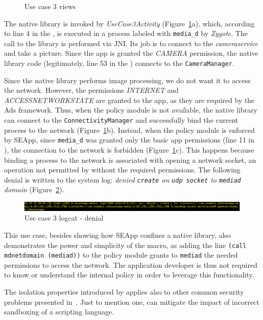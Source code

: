 \begin{figure}[h]
  \caption{\label{fig:seapp_uc3_views} Use case 3 views}
\end{figure}

The native library is invoked by {\em UseCase3Activity}
(Figure~\ref{fig:seapp_uc3_views}a), which, according to line 4 in the
\seappcontexts, is executed in a process labeled with {\tt media\_d}
by {\em Zygote}.  The call to the library is performed via JNI. Its
job is to connect to the {\em camera\textunderscore service} and take
a picture.  Since the app is granted the {\em CAMERA} permission, the
native library code (legitimately, line 53 in the \sepolicy) connects
to the {\tt CameraManager}.

Since the native library performs image processing, we do not want it
to access the network. However, the permissions {\em INTERNET} and
{\em ACCESS\textunderscore NETWORK\textunderscore STATE} are granted
to the app, as they are required by the Ads framework.  Thus, when the
policy module is not available, the native library can connect to the
{\tt ConnectivityManager} and successfully bind the current process to
the network (Figure~\ref{fig:seapp_uc3_views}b).  Instead, when the
policy module is enforced by SEApp, since {\tt media\_d} was granted
only the basic app permissions (line 11 in \sepolicy), the connection
to the network is forbidden (Figure~\ref{fig:seapp_uc3_views}c).  This
happens because binding a process to the network is associated with
opening a network socket, an operation not permitted by \sel without
the required permissions. The following denial is written to the
system log: {\em denied {\tt create} on {\tt udp\textunderscore
    socket} to {\tt media\textunderscore d} domain}
(Figure~\ref{fig:seapp_uc3_logcat}).

\begin{figure}[h]
  \centering
  \includegraphics[width=\textwidth]{chapters/seapp/figs/ae/uc35.png}
  \caption{\label{fig:seapp_uc3_logcat} Use case 3 logcat - \sel denial}  
\end{figure}      

This use case, besides showing how SEApp confines a native library,
also demonstrates the power and simplicity of the macro, as adding the
line {\tt (call md\textunderscore netdomain (media\textunderscore d))}
to the policy module grants to {\tt media\textunderscore d} the needed
permissions to access the network.  The application developer is thus
not required to know or understand the internal \sel policy in order
to leverage this functionality.

The isolation properties introduced by \seapp applies also to other
common security problems presented
in~\cite{seapp_common_play_protect_vulnerabilites}. Just to mention
one, \seapp can mitigate the impact of incorrect sandboxing of a
scripting language.

